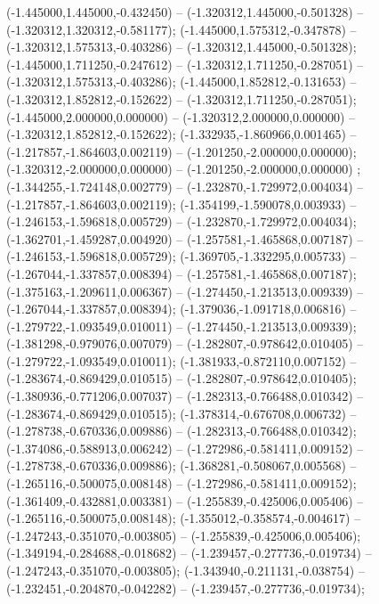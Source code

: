  (-1.445000,1.445000,-0.432450) -- (-1.320312,1.445000,-0.501328) -- (-1.320312,1.320312,-0.581177);
 (-1.445000,1.575312,-0.347878) -- (-1.320312,1.575313,-0.403286) -- (-1.320312,1.445000,-0.501328);
 (-1.445000,1.711250,-0.247612) -- (-1.320312,1.711250,-0.287051) -- (-1.320312,1.575313,-0.403286);
 (-1.445000,1.852812,-0.131653) -- (-1.320312,1.852812,-0.152622) -- (-1.320312,1.711250,-0.287051);
 (-1.445000,2.000000,0.000000) -- (-1.320312,2.000000,0.000000) -- (-1.320312,1.852812,-0.152622);
 (-1.332935,-1.860966,0.001465) -- (-1.217857,-1.864603,0.002119) -- (-1.201250,-2.000000,0.000000);
 (-1.320312,-2.000000,0.000000) -- (-1.201250,-2.000000,0.000000) ;
 (-1.344255,-1.724148,0.002779) -- (-1.232870,-1.729972,0.004034) -- (-1.217857,-1.864603,0.002119);
 (-1.354199,-1.590078,0.003933) -- (-1.246153,-1.596818,0.005729) -- (-1.232870,-1.729972,0.004034);
 (-1.362701,-1.459287,0.004920) -- (-1.257581,-1.465868,0.007187) -- (-1.246153,-1.596818,0.005729);
 (-1.369705,-1.332295,0.005733) -- (-1.267044,-1.337857,0.008394) -- (-1.257581,-1.465868,0.007187);
 (-1.375163,-1.209611,0.006367) -- (-1.274450,-1.213513,0.009339) -- (-1.267044,-1.337857,0.008394);
 (-1.379036,-1.091718,0.006816) -- (-1.279722,-1.093549,0.010011) -- (-1.274450,-1.213513,0.009339);
 (-1.381298,-0.979076,0.007079) -- (-1.282807,-0.978642,0.010405) -- (-1.279722,-1.093549,0.010011);
 (-1.381933,-0.872110,0.007152) -- (-1.283674,-0.869429,0.010515) -- (-1.282807,-0.978642,0.010405);
 (-1.380936,-0.771206,0.007037) -- (-1.282313,-0.766488,0.010342) -- (-1.283674,-0.869429,0.010515);
 (-1.378314,-0.676708,0.006732) -- (-1.278738,-0.670336,0.009886) -- (-1.282313,-0.766488,0.010342);
 (-1.374086,-0.588913,0.006242) -- (-1.272986,-0.581411,0.009152) -- (-1.278738,-0.670336,0.009886);
 (-1.368281,-0.508067,0.005568) -- (-1.265116,-0.500075,0.008148) -- (-1.272986,-0.581411,0.009152);
 (-1.361409,-0.432881,0.003381) -- (-1.255839,-0.425006,0.005406) -- (-1.265116,-0.500075,0.008148);
 (-1.355012,-0.358574,-0.004617) -- (-1.247243,-0.351070,-0.003805) -- (-1.255839,-0.425006,0.005406);
 (-1.349194,-0.284688,-0.018682) -- (-1.239457,-0.277736,-0.019734) -- (-1.247243,-0.351070,-0.003805);
 (-1.343940,-0.211131,-0.038754) -- (-1.232451,-0.204870,-0.042282) -- (-1.239457,-0.277736,-0.019734);
